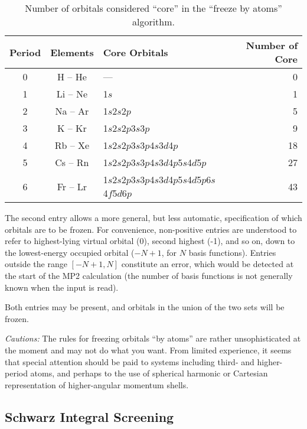 \begin{table}
\caption{Number of orbitals considered ``core'' in the ``freeze by
atoms'' algorithm.}
\label{tbl:freeze-by-atoms}
\begin{tabular}{cclr}
\hline\hline
Period & Elements & Core Orbitals & Number of Core \\
\hline
0 & H -- He  & ---                                          &  0 \\
1 & Li -- Ne & 1$s$                                         &  1 \\
2 & Na -- Ar & 1$s$2$s$2$p$                                 &  5 \\
3 & K -- Kr  & 1$s$2$s$2$p$3$s$3$p$                         &  9 \\
4 & Rb -- Xe & 1$s$2$s$2$p$3$s$3$p$4$s$3$d$4$p$             & 18 \\
5 & Cs -- Rn & 1$s$2$s$2$p$3$s$3$p$4$s$3$d$4$p$5$s$4$d$5$p$ & 27 \\
6 & Fr -- Lr & 1$s$2$s$2$p$3$s$3$p$4$s$3$d$4$p$5$s$4$d$5$p$6$s$4$f$5$d$6$p$
     & 43 \\
\hline\hline
\end{tabular}
\end{table}

The second entry allows a more general, but less automatic,
specification of which orbitals are to be frozen.  For convenience,
non-positive entries are understood to refer to highest-lying virtual
orbital (0), second highest (-1), and so on, down to the lowest-energy
occupied orbital ($-N+1$, for $N$ basis functions).  Entries outside
the range $[-N+1, N]$ constitute an error, which would be detected at
the start of the MP2 calculation (the number of basis functions is not
generally known when the input is read).

Both entries may be present, and orbitals in the union of the two sets
will be frozen.

{\em Cautions:\/}  The rules for freezing orbitals ``by atoms'' are
rather unsophisticated at the moment and may not do what you want.
From limited experience, it seems that special attention should be
paid to systems including third- and higher- period atoms, and perhaps
to the use of spherical harmonic or Cartesian representation of
higher-angular momentum shells.

\subsection{Schwarz Integral Screening}

